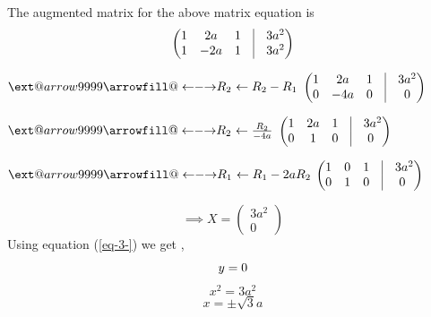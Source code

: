 \documentclass[journal,12pt,twocolumn]{IEEEtran}
\makeatletter
\newcommand\xleftrightarrow[2][]{%
  \ext@arrow 9999{\longleftrightarrowfill@}{#1}{#2}}
\newcommand\longleftrightarrowfill@{%
  \arrowfill@\leftarrow\relbar\rightarrow}
\makeatother
\begin{document}
The augmented matrix for the above matrix equation is 
\vspace{3mm}
\begin{equation}
\begin{pmatrix}
 1 & 2a & 1 & \vrule & 3a^2\\
 1 & -2a & 1  &\vrule & 3a^2
    \end{pmatrix}  
    \end{equation}
    \begin{center}
   $\xleftrightarrow{\text{$R_2$ $\leftarrow  {R_2}-{R_1}$}}$
$ \begin{pmatrix}
  1 & 2a & 1 &\vrule & 3a^2\\
 0 & -4a & 0  &\vrule & 0	  
  \end{pmatrix}$ \\
   \end{center}
   \begin{center}
$ \xleftrightarrow{\text{$R_2$ $\leftarrow  \frac{R_2}{{-4a}} $}} $
$\begin{pmatrix}
 1 & 2a & 1 & \vrule & 3a^2\\
  0 & 1 & 0 &\vrule & 0\
  \end{pmatrix}$
  \\
  \end{center}
  \begin{center}
  $ \xleftrightarrow{\text{$R_1$ $\leftarrow  {R_1}-{2aR_2}$}} $
$\begin{pmatrix}
  1 & 0 & 1 & \vrule & 3a^2\\
  0 & 1 & 0 &\vrule & 0\
  \end{pmatrix}$
  \\
  \end{center}
  \begin{equation}
\implies X = 
   \begin{pmatrix}
   3a^2 \\ 0
   \label{eq-3-}
 \end{pmatrix}
 \end{equation}
Using equation (\ref{eq-3-}) we get ,
\begin{equation}
	y = 0 \vspace{2mm}
\end{equation}
\begin{equation}
	x^2 = 3a^2 
\end{equation}
\begin{equation}						
x =  \pm\sqrt{3}a 
\end{equation}
\end{document}
